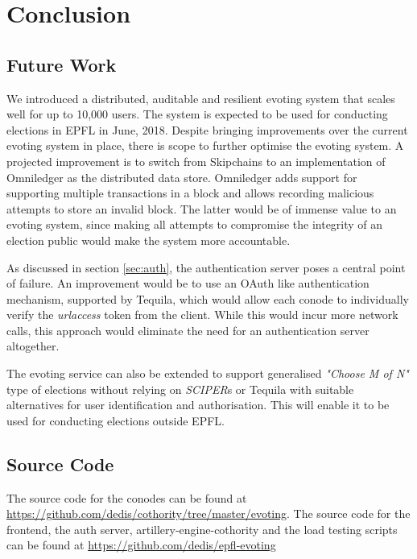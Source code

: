
\chapter{Conclusion} %

\label{Chapter5} %


\section{Future Work}
We introduced a distributed, auditable and resilient evoting system that scales well for up to 10,000 users. The system is expected to be used for conducting elections in EPFL in June, 2018. Despite bringing improvements over the current evoting system in place, there is scope to further optimise the evoting system. A projected improvement is to switch from Skipchains to an implementation of Omniledger \cite{omniledger} as the distributed data store. Omniledger adds support for supporting multiple transactions in a block and allows recording malicious attempts to store an invalid block. The latter would be of immense value to an evoting system, since making all attempts to compromise the integrity of an election public would make the system more accountable.

As discussed in section \ref{sec:auth}, the authentication server poses a central point of failure. An improvement would be to use an OAuth like authentication mechanism, supported by Tequila, which would allow each conode to individually verify the \textit{urlaccess} token from the client. While this would incur more network calls, this approach would eliminate the need for an authentication server altogether.

The evoting service can also be extended to support generalised \textit{"Choose M of N"} type of elections without relying on \textit{SCIPER}s or Tequila with suitable alternatives for user identification and authorisation. This will enable it to be used for conducting elections outside EPFL.

\pagebreak

\section{Source Code}
The source code for the conodes can be found at \url{https://github.com/dedis/cothority/tree/master/evoting}. The source code for the frontend, the auth server, artillery-engine-cothority and the load testing scripts can be found at \url{https://github.com/dedis/epfl-evoting}